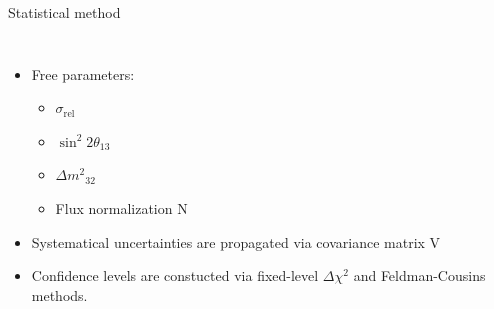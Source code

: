 \documentclass[usenames, dvipsnames]{beamer}
\newcommand{\Dm}{\ensuremath{\Delta m^2}}
\newcommand{\Important}{\textcolor{BrickRed}}
\newcommand{\impitem}{\item[\Important{$\bullet$}]}
\newcommand{\srel}{\ensuremath{\sigma_{\text{rel}}}}
\begin{document}
\begin{frame}[fragile]
\begin{columns}[T]
\begin{column}{.47\textwidth}
\begin{block}{Statistical method}
\begin{columns}[T]
\begin{column}{0.5\textwidth}
\begin{equation*}
                    \end{equation*} 
            \vspace*{-1.85cm}
            {\hskip-1cm{
            \begin{itemize}
                \item Free parameters:
                    \begin{itemize}
                    \impitem \Important{\srel}
                    \impitem \Important{\ensuremath{\sin^2 2\theta_{13}}}
                    \impitem \Important{\ensuremath{\Dm_{32}}}
                    \impitem Flux normalization \Important{N}
                    \end{itemize}
                \item Systematical uncertainties are propagated via covariance
                    matrix \Important{V}
                    \impitem Confidence levels are constucted via \Important{fixed-level
                        \ensuremath{\Delta \chi^2}} and 
                        \Important{Feldman-Cousins} methods.
            \end{itemize}
        }
        }
        \end{column}
    \end{columns}
\end{block}


\end{column}
\end{columns}
\end{frame}
\end{document}
